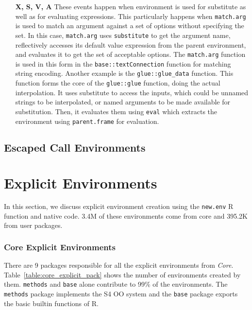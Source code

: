 \documentclass[10pt,review,sigplan,anonymous=true,authorversion=true,nonacm=true]{acmart}
\newcommand{\code}[1]{\lstinline |#1|\xspace}
\newcommand{\newEnv}{\code{new.env}}
\begin{document}
\begin{itemize}
\item[\textbf{X, S, V, A}] These events happen when environment is used for
  substitute as well as for evaluating expressions. This particularly happens
  when \code{match.arg} is used to match an argument against a set of options
  without specifying the set. In this case, \code{match.arg} uses
  \code{substitute} to get the argument name, reflectively accesses its default
  value expression from the parent environment, and evaluates it to get the set
  of acceptable options. The \code{match.arg} function is used in this form in
  the \code{base::textConnection} function for matching string encoding. Another
  example is the \code{glue::glue_data} function. This function forms the core
  of the \code{glue::glue} function, doing the actual interpolation. It uses
  substitute to access the inputs, which could be unnamed strings to be
  interpolated, or named arguments to be made available for substitution. Then,
  it evaluates them using \code{eval} which extracts the environment using
  \code{parent.frame} for evaluation.
\end{itemize}


\subsection{Escaped Call Environments}



\section{Explicit Environments}
In this section, we discuss explicit environment creation using the \newEnv R
function and native code. 3.4M of these environments come from core and 395.2K
from user packages.

\subsubsection{Core Explicit Environments}

There are 9 packages responsible for all the explicit environments from
\emph{Core}. Table~\ref{table:core_explicit_pack} shows the number of
environments created by them. \code{methods} and \code{base} alone contribute to
99\% of the environments. The \code{methods} package implements the S4 OO system
and the \code{base} package exports the basic builtin functions of R.
\end{document}
